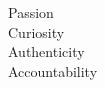 \documentclass[preview]{standalone}
\begin{document}
\begin{center}
Passion\\Curiosity\\Authenticity\\Accountability
\end{center}
\end{document}
